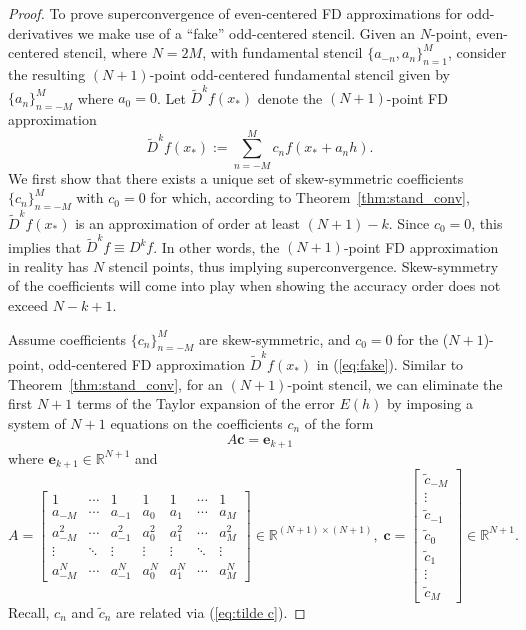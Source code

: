 \documentclass[12pt]{article}
\newcommand{\xstar}{x_*}
\newcommand{\FD}{D}
\begin{document}
\begin{proof}  
To prove superconvergence of even-centered FD approximations for odd-derivatives we make use of a ``fake'' odd-centered stencil.
Given an $N$-point, even-centered stencil, where $N=2M$, with fundamental stencil $\{a_{-n},a_n\}_{n=1}^M$, consider the resulting $(N+1)$-point odd-centered fundamental stencil given by $\{a_n\}_{n=-M}^M$ where $a_0=0$.
Let $\tilde \FD^k f(\xstar)$ denote the $(N+1)$-point FD approximation
\begin{equation}\label{eq:fake}
	\tilde\FD^k f(\xstar) := \sum_{n=-M}^M c_nf(\xstar+a_nh).
\end{equation}
We first show that there exists a unique set of skew-symmetric coefficients $\{c_n\}_{n=-M}^M$ with $c_0=0$ for which, according to Theorem~\ref{thm:stand_conv}, $\tilde\FD^k f(\xstar)$ is an approximation of order at least $(N+1)-k$.
Since $c_0=0$, this implies that $\tilde \FD^k f\equiv D^kf$.
In other words, the $(N+1)$-point FD approximation in reality has $N$ stencil points, thus implying superconvergence.
Skew-symmetry of the coefficients will come into play when showing the accuracy order does not exceed $N-k+1$.

Assume coefficients $\{c_n\}_{n=-M}^M$ are skew-symmetric, and $c_0=0$ for the ($N+1$)-point, odd-centered FD approximation $\tilde\FD^kf(\xstar)$ in (\ref{eq:fake}).
Similar to Theorem~\ref{thm:stand_conv}, for an $(N+1)$-point stencil, we can eliminate the first $N+1$ terms of the Taylor expansion of the error $E(h)$ by imposing a system of $N+1$ equations on the coefficients $c_n$ of the form
\begin{equation}\label{eq:big}
	A\mathbf c = \mathbf e_{k+1}
\end{equation}
where $\mathbf e_{k+1}\in \mathbb R^{N+1}$ and
\begin{equation}\label{eq:MatAOE}
	A =
	\begin{bmatrix}
		1 &\cdots & 1 &1 & 1 & \cdots & 1\\
		a_{-M}& \cdots& a_{-1}& a_0 & a_1 & \cdots & a_M\\
		a_{-M}^2& \cdots& a_{-1}^2& a_0^2 & a_1^2 & \cdots & a_M^2\\
		\vdots & \ddots & \vdots & \vdots & \vdots & \ddots & \vdots\\
		a_{-M}^{N}&\cdots & a_{-1}^{N}& a_0^N & a_1^{N} & \cdots & a_M^{N}
	\end{bmatrix}\in\mathbb R^{(N+1)\times (N+1)}, \;
	\mathbf c = \begin{bmatrix}
		\tilde c_{-M}\\  \vdots \\ \tilde c_{-1}\\ \tilde c_0\\ \tilde c_1\\ \vdots \\ \tilde c_{M}
	\end{bmatrix}\in\mathbb R^{N+1}.
\end{equation}
Recall, $c_n$ and $\tilde c_n$ are related via (\ref{eq:tilde c}).


\end{proof}
\end{document}
